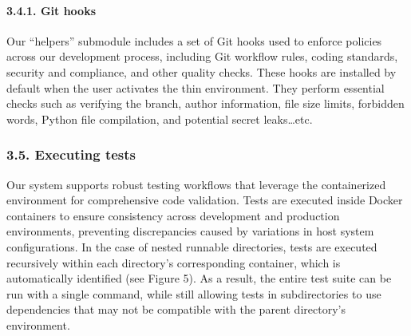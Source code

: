 \documentclass{article}
\begin{document}
%
%
%

\paragraph{3.4.1. Git hooks}
\label{git-hooks}

Our ``helpers'' submodule includes a set of Git hooks used to enforce policies
across our development process, including Git workflow rules, coding standards, security
and compliance, and other quality checks. These hooks are installed by default when
the user activates the thin environment. They perform essential checks such as
verifying the branch, author information, file size limits, forbidden words,
Python file compilation, and potential secret leaks\ldots etc.

\subsubsection{3.5. Executing tests}
\label{executing-tests}

Our system supports robust testing workflows that leverage the containerized environment
for comprehensive code validation. Tests are executed inside Docker containers
to ensure consistency across development and production environments, preventing
discrepancies caused by variations in host system configurations. In the case of
nested runnable directories, tests are executed recursively within each directory's
corresponding container, which is automatically identified (see Figure 5). As a result,
the entire test suite can be run with a single command, while still allowing tests
in subdirectories to use dependencies that may not be compatible with the parent
directory's environment.

%
%
\end{document}
